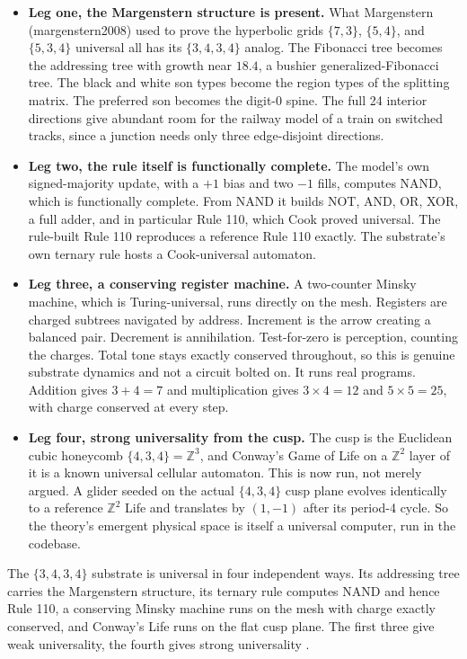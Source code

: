 \begin{itemize}
  \item \textbf{Leg one, the Margenstern structure is present.} What Margenstern (margenstern2008) used to prove the hyperbolic grids $\{7,3\}$, $\{5,4\}$, and $\{5,3,4\}$ universal all has its $\{3,4,3,4\}$ analog. The Fibonacci tree becomes the addressing tree with growth near $18.4$, a bushier generalized-Fibonacci tree. The black and white son types become the region types of the splitting matrix. The preferred son becomes the digit-0 spine. The full 24 interior directions give abundant room for the railway model of a train on switched tracks, since a junction needs only three edge-disjoint directions.
  \item \textbf{Leg two, the rule itself is functionally complete.} The model's own signed-majority update, with a $+1$ bias and two $-1$ fills, computes NAND, which is functionally complete. From NAND it builds NOT, AND, OR, XOR, a full adder, and in particular Rule 110, which Cook proved universal. The rule-built Rule 110 reproduces a reference Rule 110 exactly. The substrate's own ternary rule hosts a Cook-universal automaton.
  \item \textbf{Leg three, a conserving register machine.} A two-counter Minsky machine, which is Turing-universal, runs directly on the mesh. Registers are charged subtrees navigated by address. Increment is the arrow creating a balanced pair. Decrement is annihilation. Test-for-zero is perception, counting the charges. Total tone stays exactly conserved throughout, so this is genuine substrate dynamics and not a circuit bolted on. It runs real programs. Addition gives $3+4=7$ and multiplication gives $3 \times 4 = 12$ and $5 \times 5 = 25$, with charge conserved at every step.
  \item \textbf{Leg four, strong universality from the cusp.} The cusp is the Euclidean cubic honeycomb $\{4,3,4\} = \mathbb{Z}^3$, and Conway's Game of Life on a $\mathbb{Z}^2$ layer of it is a known universal cellular automaton. This is now run, not merely argued. A glider seeded on the actual $\{4,3,4\}$ cusp plane evolves identically to a reference $\mathbb{Z}^2$ Life and translates by $(1,-1)$ after its period-4 cycle. So the theory's emergent physical space is itself a universal computer, run in the codebase.
\end{itemize}

\begin{result}
The $\{3,4,3,4\}$ substrate is universal in four independent ways. Its addressing tree carries the Margenstern structure, its ternary rule computes NAND and hence Rule 110, a conserving Minsky machine runs on the mesh with charge exactly conserved, and Conway's Life runs on the flat cusp plane. The first three give weak universality, the fourth gives strong universality \cite{pollard2026vibetest}.
\end{result}

